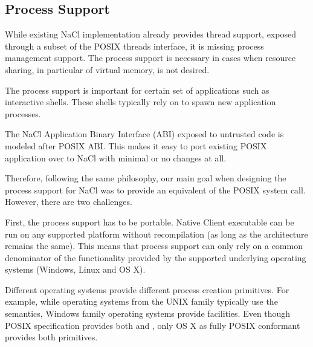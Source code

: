 
\subsection{Process Support}
\label{sub:process_support}

While existing NaCl implementation already provides thread support,
exposed through a subset of the POSIX threads interface, it is missing
process management support. The process support is necessary in cases
when resource sharing, in particular of virtual memory, is not desired.

The process support is important for certain set of applications such
as interactive shells. These shells typically rely on  to
spawn new application processes. 


The NaCl Application Binary Interface (ABI) exposed to untrusted code is
modeled after POSIX ABI. This makes it easy to port existing POSIX
application over to NaCl with minimal or no changes at all.

Therefore, following the same philosophy, our main goal when designing
the process support for NaCl was to provide an equivalent of the POSIX
 system call. However, there are two challenges.

First, the process support has to be portable. Native Client executable
can be run on any supported platform without recompilation (as long as
the architecture remains the same). This means that process support can
only rely on a common denominator of the functionality provided by the
supported underlying operating systems (\ie Windows, Linux and OS X).

Different operating systems provide different process creation
primitives. For example, while operating systems from the UNIX family
typically use the  semantics, Windows family operating
systems provide  facilities. Even though POSIX
specification provides both  and ,
only OS X as fully POSIX conformant provides both primitives.

